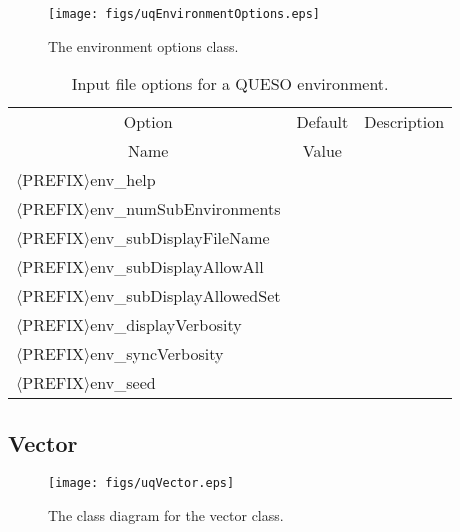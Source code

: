\begin{figure}[h!]
\begin{center}
\texttt{[image: figs/uqEnvironmentOptions.eps]}
\end{center}
\caption{
The environment options class.
}
\label{fig-env-options-class}
\end{figure}

\begin{table}[!h]
\begin{center}
\begin{tabular}{|l|c|c|}
\hline
\multicolumn{1}{|c|}{Option}                      & Default & Description \\
\multicolumn{1}{|c|}{Name}                        & Value   &             \\
\hline
\hline
$\langle$PREFIX$\rangle$env\_help                 &         &             \\
\hline
$\langle$PREFIX$\rangle$env\_numSubEnvironments   &         &             \\
\hline
$\langle$PREFIX$\rangle$env\_subDisplayFileName   &         &             \\
\hline
$\langle$PREFIX$\rangle$env\_subDisplayAllowAll   &         &             \\
\hline
$\langle$PREFIX$\rangle$env\_subDisplayAllowedSet &         &             \\
\hline
$\langle$PREFIX$\rangle$env\_displayVerbosity     &         &             \\
\hline
$\langle$PREFIX$\rangle$env\_syncVerbosity        &         &             \\
\hline
$\langle$PREFIX$\rangle$env\_seed                 &         &             \\
\hline
\end{tabular}
\end{center}
\caption{
Input file options for a QUESO environment.
}
\label{tab-env-options}
\end{table}

\clearpage
\subsection{Vector}

\begin{figure}[h!]
\centerline{
\texttt{[image: figs/uqVector.eps]}
}
\caption{
The class diagram for the vector class.
}
\label{fig-vector-class}
\end{figure}

